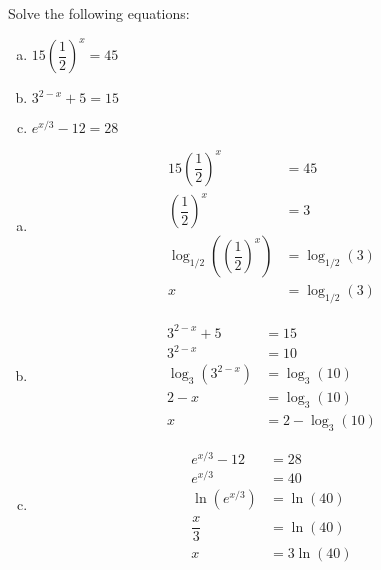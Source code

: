 \documentclass[11pt,letterpaper]{article}
\begin{document}
\newpage



 Solve the following equations:
	\begin{enumerate}[(a)]
	\item $15 \left( \dfrac{1}{2} \right)^x= 45$
	\item $3^{2 - x} + 5= 15$
	\item $e^{x/3} - 12= 28$
	\end{enumerate} \pspace

\sol
\begin{enumerate}[(a)]
\item 
	\[
	\begin{aligned}
	15 \left( \dfrac{1}{2} \right)^x&= 45 \\[0.3cm]
	\left( \dfrac{1}{2} \right)^x&= 3 \\[0.3cm]
	\log_{1/2} \left( \left( \dfrac{1}{2} \right)^x \right)&= \log_{1/2}(3) \\[0.3cm]
	x&= \log_{1/2}(3)
	\end{aligned}
	\] \pspace

\item 
	\[
	\begin{aligned}
	3^{2 - x} + 5&= 15 \\[0.3cm]
	3^{2 - x}&= 10 \\[0.3cm]
	\log_3(3^{2 - x})&= \log_3(10) \\[0.3cm]
	2 - x&= \log_3(10) \\[0.3cm]
	x&= 2 - \log_3(10)
	\end{aligned}
	\]

\item 
	\[
	\begin{aligned}
	e^{x/3} - 12&= 28 \\[0.3cm]
	e^{x/3}&= 40 \\[0.3cm]
	\ln(e^{x/3})&= \ln(40) \\[0.3cm]
	\dfrac{x}{3}&= \ln(40) \\[0.3cm]
	x&= 3 \ln(40)
	\end{aligned}
	\]
\end{enumerate}
\end{document}
